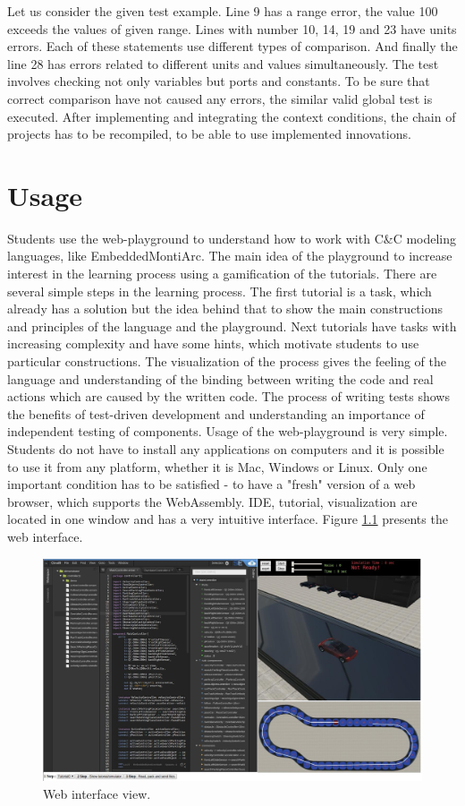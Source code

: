 \bigskip
Let us consider the given test example. Line 9 has a range error, the value 100 exceeds the values of given range. Lines with number 10, 14, 19 and 23 have units errors. Each of these statements use different types of comparison. And finally the line 28 has errors related to different units and values simultaneously. The test involves checking not only variables but ports and constants. To be sure that correct comparison have not caused any errors, the similar valid global test is executed. After implementing and integrating the context conditions, the chain of projects has to be recompiled, to be able to use implemented innovations.

\chapter{Usage} \label{sec:usage}
Students use the web-playground to understand how to work with C\&C modeling languages, like EmbeddedMontiArc. The main idea of the playground to increase interest in the learning process using a gamification of the tutorials. There are several simple steps in the learning process. The first tutorial is a task, which already has a solution but the idea behind that to show the main constructions and principles of the language and the playground. Next tutorials have tasks with increasing complexity and have some hints, which motivate students to use particular constructions. The visualization of the process gives the feeling of the language and understanding of the binding between writing the code and real actions which are caused by the written code. The process of writing tests shows the benefits of test-driven development and understanding an importance of independent testing of components. Usage of the web-playground is very simple. Students do not have to install any applications on computers and it is possible to use it from any platform, whether it is Mac, Windows or Linux. Only one important condition has to be satisfied - to have a "fresh" version of a web browser, which supports the WebAssembly. IDE, tutorial, visualization are located in one window and has a very intuitive interface. Figure \ref{fig:web-interface} presents the web interface.
\begin{figure}[h!]
    \centering
    \includegraphics[width=0.9\linewidth]{src/pic/web-interface}
    \caption{Web interface view.}
    \label{fig:web-interface}
\end{figure} \newpage
